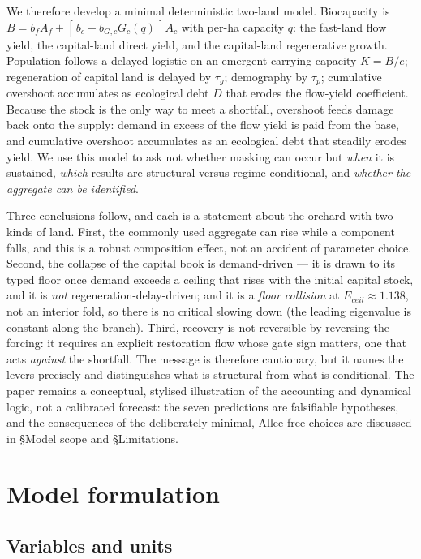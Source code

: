 \documentclass[11pt]{article}
\begin{document}
We therefore develop a minimal deterministic two-land model. Biocapacity is $B=b_f A_f + [\,b_c + b_{G,c}G_c(q)\,]A_c$ with per-ha capacity $q$: the fast-land flow yield, the capital-land direct yield, and the capital-land regenerative growth. Population follows a delayed logistic on an emergent carrying capacity $K=B/e$; regeneration of capital land is delayed by $\tau_g$; demography by $\tau_p$; cumulative overshoot accumulates as ecological debt $D$ that erodes the flow-yield coefficient. Because the stock is the only way to meet a shortfall, overshoot feeds damage back onto the supply: demand in excess of the flow yield is paid from the base, and cumulative overshoot accumulates as an ecological debt that steadily erodes yield. We use this model to ask not whether masking can occur but \emph{when} it is sustained, \emph{which} results are structural versus regime-conditional, and \emph{whether the aggregate can be identified}.

Three conclusions follow, and each is a statement about the orchard with two kinds of land. First, the commonly used aggregate can rise while a component falls, and this is a robust composition effect, not an accident of parameter choice. Second, the collapse of the capital book is demand-driven --- it is drawn to its typed floor once demand exceeds a ceiling that rises with the initial capital stock, and it is \emph{not} regeneration-delay-driven; and it is a \emph{floor collision} at $E_{ceil}\approx1.138$, not an interior fold, so there is no critical slowing down (the leading eigenvalue is constant along the branch). Third, recovery is not reversible by reversing the forcing: it requires an explicit restoration flow whose gate sign matters, one that acts \emph{against} the shortfall. The message is therefore cautionary, but it names the levers precisely and distinguishes what is structural from what is conditional. The paper remains a conceptual, stylised illustration of the accounting and dynamical logic, not a calibrated forecast: the seven predictions are falsifiable hypotheses, and the consequences of the deliberately minimal, Allee-free choices are discussed in \S Model scope and \S Limitations.

\section{Model formulation}

\subsection{Variables and units}
\end{document}
